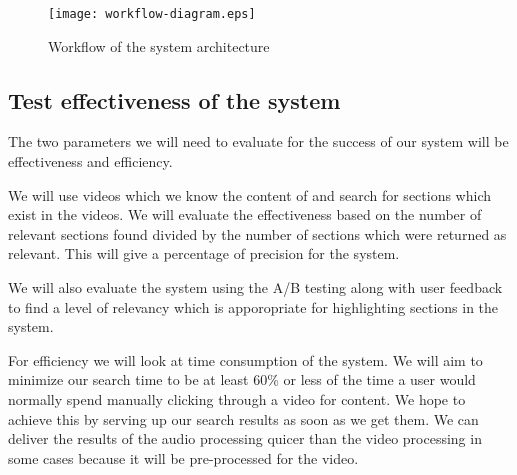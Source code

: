 \documentclass[a4paper,12pt]{article}
\begin{document}
\begin{figure}[ht]
\centering
\texttt{[image: workflow-diagram.eps]}
\caption{Workflow of the system architecture}
\label{fig:arch-diagram}
\end{figure}

\subsection{Test effectiveness of the system}
The two parameters we will need to evaluate for the success of our system will be effectiveness and efficiency.

We will use videos which we know the content of and search for sections which exist in the videos. We will evaluate the effectiveness based on the number of relevant sections found divided by the number of sections which were returned as relevant. This will give a percentage of precision for the system.

We will also evaluate the system using the A/B testing along with user feedback to find a level of relevancy which is apporopriate for highlighting sections in the system.

For efficiency we will look at time consumption of the system. We will aim to minimize our search time to be at least 60\% or less of the time a user would normally spend manually clicking through a video for content. We hope to achieve this by serving up our search results as soon as we get them. We can deliver the results of the audio processing quicer than the video processing in some cases because it will be pre-processed for the video.

\newpage
\end{document}
